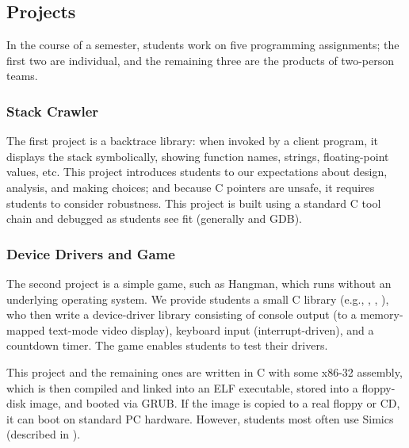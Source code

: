 \subsection{Projects}

In the course of a semester, students work on five
programming assignments; the first two are individual,
and the remaining three are the products of two-person
teams.

\subsubsection{Stack Crawler}

The first project is a backtrace library: %
when invoked by a client program, it displays the
stack symbolically,
showing function names, strings, floating-point values, etc.
This project
introduces students to our expectations about
design, analysis, and making choices;
and
because C pointers are unsafe, it requires students
to consider robustness.
%
This project is built using a standard C tool chain
and debugged as students see fit (generally  and GDB).

\subsubsection{Device Drivers and Game}

The second project is a simple game, such as Hangman,
which runs without an underlying
operating system.
We provide students a small C library %
(e.g., , , ),
who then write a device-driver library consisting of
console output (to a memory-mapped text-mode video display),
keyboard input (interrupt-driven),
and a countdown timer.
The game enables students to test their drivers.
%
%

This project and the remaining ones are written in
C with some x86-32 assembly,
which is then
compiled and linked into an ELF executable,
stored into a %
floppy-disk image,
and booted via GRUB.
If the image is copied to a real floppy or CD,
it can boot on standard PC hardware.
However, students most often use
Simics \cite{simics} (described in \sect{\ref{sec:simics}}).

